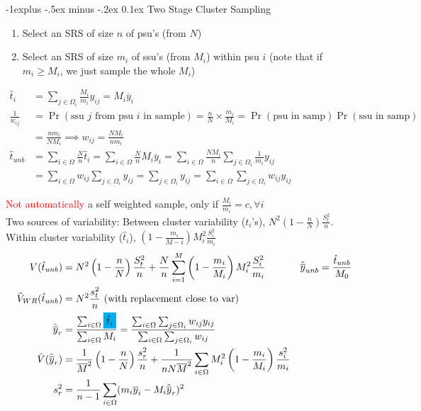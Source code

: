 \documentclass[landscape]{article}
\makeatletter
\renewcommand{\subsection}{\@startsection{subsection}{2}{0mm}%
                                {-1explus -.5ex minus -.2ex}%
                                {0.1ex}%
                                {\color{orange}\normalfont\normalsize\bfseries}}
\makeatother
\begin{document}
\begin{multicols*}{3}
\subsection{Two Stage Cluster Sampling}
\begin{enumerate}
\item Select an SRS of size $n$ of psu's (from $N$)
\item Select an SRS of size $m_i$ of ssu's (from $M_i$) within psu $i$
  (note that if $m_i \geq M_i$, we just sample the whole $M_i$)
\end{enumerate}
\begin{align*}
  \hat{t}_i & = \sum_{j \in \Omega_i}\frac{M_i}{m_i}y_{ij} = M_i \overline{y}_i
  \\ \frac{1}{w_{ij}} & = \Pr(\text{ssu $j$ from psu $i$ in sample}) =
                        \frac{n}{N} \times \frac{m_i}{M_i} =
                        \Pr(\text{psu in samp})\Pr(\text{ssu in samp})
  \\ & = \frac{nm_i}{NM_i} \implies w_{ij} = \frac{NM_i}{nm_i}
  \\ \hat{t}_{unb} & = \sum_{i \in \Omega} \frac{N}{n} \hat{t}_i = \sum_{i \in \Omega} \frac{N}{n} M_i \overline{y}_i = \sum_{i \in \Omega} \frac{NM_i}{n} \sum_{j \in \Omega_i}\frac{1}{m_i}y_{ij}
  \\ & = \sum_{i \in \Omega} w_{ij} \sum_{j \in \Omega_i} y_{ij} = \sum_{j \in \Omega_i} y_{ij} = \sum_{i \in \Omega} \sum_{j \in \Omega_i} w_{ij} y_{ij}
\end{align*}

\textcolor{red}{Not automatically} a self weighted sample, only if
$\frac{M_i}{m_i} = c, \forall i$
\\ Two sources of variability: Between cluster variability ($t_i$'s),
$N^2 \left(1 - \frac{n}{N}\right) \frac{S_t^2}{n}$. Within cluster
variability ($\hat{t}_i$), $\left(1 - \frac{m_i}{M-i}\right) M_i^2
\frac{S_i^2}{m_i}$
\begin{align*}
  V(\hat{t}_{unb}) & = N^2 \left(1 - \frac{n}{N}\right) \frac{S_t^2}{n} + \frac{N}{n} \sum_{i=1}^M \left(1 - \frac{m_i}{M_i}\right)M_i^2 \frac{S_i^2}{m_i}
                              & \hat{\overline{y}}_{unb} & = \frac{\hat{t}_{unb}}{M_0}
  \\ \hat{V}_{WR}(\hat{t}_{unb}) & = N^2 \frac{s_t^2}{n} \text{ (with
                                   replacement close to var)}
  \\ \hat{\overline{y}}_r & = \frac{\sum_{i \in \Omega}\colorbox{cyan}{$\hat{t}_i$}}{\sum_{i \in \Omega}M_i} = \frac{\sum_{i \in \Omega}\sum_{j \in \Omega_i} w_{ij}y_{ij}}{\sum_{i \in \Omega} \sum_{j \in \Omega_i} w_{ij}}
  \\ \hat{V}(\hat{\overline{y}}_r) & = \frac{1}{\overline{M}^2} \left(1 - \frac{n}{N}\right) \frac{s_r^2}{n} + \frac{1}{nN \overline{M}^2} \sum_{i \in \Omega} M_i^2 \left(1 - \frac{m_i}{M_i}\right) \frac{s_i^2}{m_i}
  \\ s_r^2 & = \frac{1}{n-1} \sum_{i \in \Omega} (m_i \overline{y}_i - M_i \hat{\overline{y}}_r)^2
\end{align*}

\end{multicols*}
\end{document}
